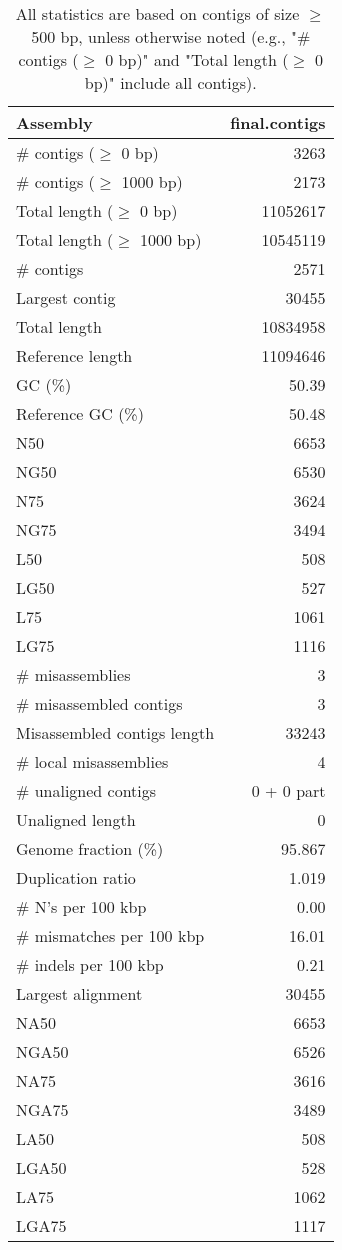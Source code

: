 \documentclass[12pt,a4paper]{article}
\begin{document}
\begin{table}[ht]
\begin{center}
\caption{All statistics are based on contigs of size $\geq$ 500 bp, unless otherwise noted (e.g., "\# contigs ($\geq$ 0 bp)" and "Total length ($\geq$ 0 bp)" include all contigs).}
\begin{tabular}{|l*{1}{|r}|}
\hline
Assembly & final.contigs \\ \hline
\# contigs ($\geq$ 0 bp) & 3263 \\ \hline
\# contigs ($\geq$ 1000 bp) & 2173 \\ \hline
Total length ($\geq$ 0 bp) & 11052617 \\ \hline
Total length ($\geq$ 1000 bp) & 10545119 \\ \hline
\# contigs & 2571 \\ \hline
Largest contig & 30455 \\ \hline
Total length & 10834958 \\ \hline
Reference length & 11094646 \\ \hline
GC (\%) & 50.39 \\ \hline
Reference GC (\%) & 50.48 \\ \hline
N50 & 6653 \\ \hline
NG50 & 6530 \\ \hline
N75 & 3624 \\ \hline
NG75 & 3494 \\ \hline
L50 & 508 \\ \hline
LG50 & 527 \\ \hline
L75 & 1061 \\ \hline
LG75 & 1116 \\ \hline
\# misassemblies & 3 \\ \hline
\# misassembled contigs & 3 \\ \hline
Misassembled contigs length & 33243 \\ \hline
\# local misassemblies & 4 \\ \hline
\# unaligned contigs & 0 + 0 part \\ \hline
Unaligned length & 0 \\ \hline
Genome fraction (\%) & 95.867 \\ \hline
Duplication ratio & 1.019 \\ \hline
\# N's per 100 kbp & 0.00 \\ \hline
\# mismatches per 100 kbp & 16.01 \\ \hline
\# indels per 100 kbp & 0.21 \\ \hline
Largest alignment & 30455 \\ \hline
NA50 & 6653 \\ \hline
NGA50 & 6526 \\ \hline
NA75 & 3616 \\ \hline
NGA75 & 3489 \\ \hline
LA50 & 508 \\ \hline
LGA50 & 528 \\ \hline
LA75 & 1062 \\ \hline
LGA75 & 1117 \\ \hline
\end{tabular}
\end{center}
\end{table}
\end{document}
